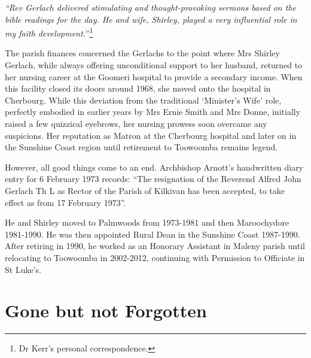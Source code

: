 \emph{``Rev Gerlach delivered stimulating and thought-provoking sermons based on the bible readings for the day. He and wife, Shirley, played a very influential role in my faith development.}''\footnote{Dr Kerr's personal correspondence.}


The parish finances concerned the Gerlachs to the point where Mrs Shirley Gerlach, while always offering unconditional support to her husband, returned to her nursing career at the Goomeri hospital to provide a secondary income. When this facility closed its doors around 1968, she moved onto the hospital in Cherbourg. While this deviation from the traditional `Minister's Wife' role, perfectly embodied in earlier years by Mrs Ernie Smith and Mrs Donne, initially raised a few quizzical eyebrows, her nursing prowess soon overcame any suspicions. Her reputation as Matron at the Cherbourg hospital and later on in the Sunshine Coast region until retirement to Toowoomba remains legend.



However, all good things come to an end. Archbishop Arnott's handwritten diary entry for 6 February 1973 records: ``The resignation of the Reverend Alfred John Gerlach Th L as Rector of the Parish of Kilkivan has been accepted, to take effect as from 17 February 1973''.



He and Shirley moved to Palmwoods from 1973-1981 and then Maroochydore 1981-1990. He was then appointed Rural Dean in the Sunshine Coast 1987-1990. After retiring in 1990, he worked as an Honorary Assistant in Maleny parish until relocating to Toowoomba in 2002-2012, continuing with Permission to Officiate in St Luke's.



\section{Gone but not Forgotten}



